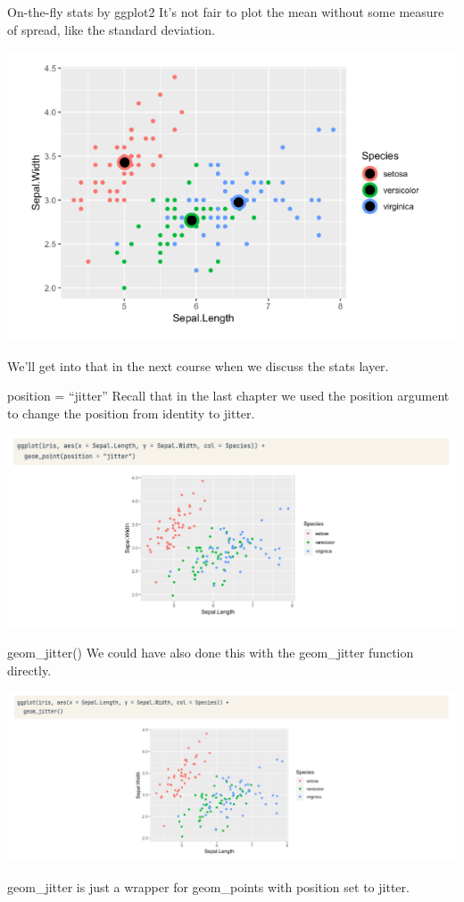 \documentclass[
  ignorenonframetext,
]{beamer}
\begin{document}
\begin{frame}{On-the-fly stats by ggplot2}
\label{on-the-fly-stats-by-ggplot2}
It's not fair to plot the mean without some measure of spread, like the
standard deviation.

\includegraphics{../images/im193.png}

We'll get into that in the next course when we discuss the stats layer.
\end{frame}

\begin{frame}{position = ``jitter''}
\label{position-jitter-1}
Recall that in the last chapter we used the position argument to change
the position from identity to jitter.

\includegraphics{../images/im194.png}
\end{frame}

\begin{frame}{geom\_jitter()}
\label{geom_jitter}
We could have also done this with the geom\_jitter function directly.

\includegraphics{../images/im195.png}

geom\_jitter is just a wrapper for geom\_points with position set to
jitter.
\end{frame}
\end{document}

